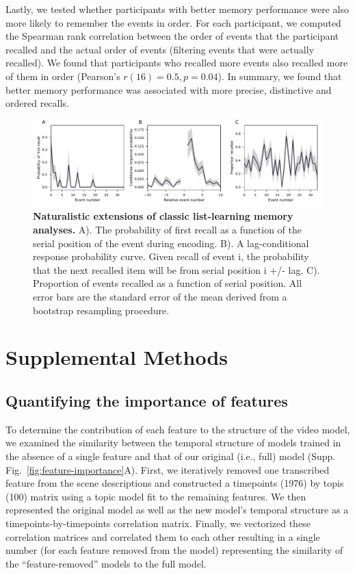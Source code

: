 \documentclass{article}
\begin{document}
Lastly, we tested whether participants with better memory performance were also more likely to remember the events in order.  For each participant, we computed the Spearman rank correlation between the order of events that the participant recalled and the actual order of events (filtering events that were actually recalled).  We found that participants who recalled more events also recalled more of them in order (Pearson's $r(16) = 0.5, p = 0.04$). In summary, we found that better memory performance was associated with more precise, distinctive and ordered recalls.

\begin{figure}[tb]
\centering
\includegraphics[width=1\textwidth]{figs/supp3_list_learning.pdf}
\caption{\small \textbf{Naturalistic extensions of classic list-learning memory analyses.} A). The probability of first recall as a function of the serial position of the event during encoding. B). A lag-conditional response probability curve. Given recall of event i, the probability that the next recalled item will be from serial position i +/- lag. C). Proportion of events recalled as a function of serial position. All error bars are the standard error of the mean derived from a bootstrap resampling procedure.}
\label{fig:list-learning}
\end{figure}

\section*{Supplemental Methods}
\subsection*{Quantifying the importance of features}
To determine the contribution of each feature to the structure of the video model, we examined the similarity between the temporal structure of models trained in the absence of a single feature and that of our original (i.e., full) model (Supp. Fig.~\ref{fig:feature-importance}A). First, we iteratively removed one transcribed feature from the scene descriptions and constructed a timepoints (1976) by topis (100) matrix using a topic model fit to the remaining features. We then represented the original model as well as the new model’s temporal structure as a timepoints-by-timepoints correlation matrix. Finally, we vectorized these correlation matrices and correlated them to each other resulting in a single number (for each feature removed from the model) representing the similarity of the ``feature-removed'' models to the full model.
\end{document}
